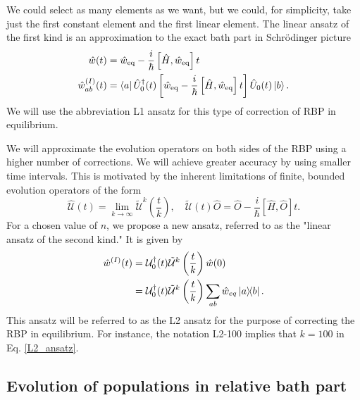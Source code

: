 We could select as many elements as we want, but we could, for simplicity, take just the first constant element and the first linear element. The linear ansatz of the first kind is an approximation to the exact bath part in Schrödinger picture
\begin{equation}
\label{L1_ansatz}
\begin{aligned}
    \hat{w}(t) &= \hat{w}_\text{eq} - \frac{i}{\hbar} \left[ \hat{H}, \hat{w}_\text{eq}\right] t \\
    \hat{w}^{(I)}_{ab}(t) &= \bra{a} \hat{U}_0^\dagger(t)  \left[\hat{w}_\text{eq} - \frac{i}{\hbar} \left[ \hat{H}, \hat{w}_\text{eq}\right] t \right] \hat{U}_0(t)  \ket{b}.
\end{aligned}
\end{equation}
We will use the abbreviation L1 ansatz for this type of correction of RBP in equilibrium.

We will approximate the evolution operators on both sides of the RBP using a higher number of corrections. We will achieve greater accuracy by using smaller time intervals. This is motivated by the inherent limitations of finite, bounded evolution operators of the form
\begin{equation}
    \hat{\mathcal{U}}(t) = \lim_{k \longrightarrow \infty} \tilde{\mathcal{U}}^k\left(\frac{t}{k}\right), \quad \tilde{\mathcal{U}}(t)\hat{O} = \hat{O} -\frac{i}{\hbar} \left[ \hat{H}, \hat{O}\right] t.
\end{equation}
For a chosen value of $n$, we propose a new ansatz, referred to as the "linear ansatz of the second kind." It is given by
\begin{equation}
\label{L2_ansatz}
    \begin{aligned}
    \hat{w}^{(I)}(t) &= \mathcal{U}^\dagger_0(t) \tilde{\mathcal{U}}^k\left(\frac{t}{k}\right) \hat{w}(0) \\
    &=  \mathcal{U}^\dagger_0(t) \tilde{\mathcal{U}}^k\left(\frac{t}{k}\right) \sum_{ab} \hat{w}_{eq}\ketbra{a}{b}.
    \end{aligned}
\end{equation}
This ansatz will be referred to as the L2 ansatz for the purpose of correcting the RBP in equilibrium. For instance, the notation L2-100 implies that $k=100$ in Eq. \ref{L2_ansatz}.

\subsection{Evolution of populations in relative bath part}

